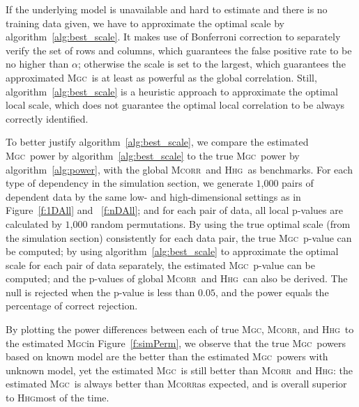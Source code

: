 \documentclass[11pt]{article}
\providecommand{\sct}[1]{{\normalfont\textsc{#1}}}
\newcommand{\Mgc}{\sct{Mgc}}
\newcommand{\Hhg}{\sct{Hhg}}
\newcommand{\Mcorr}{\sct{Mcorr}}
\begin{document}
If the underlying model is unavailable and hard to estimate and there is no training data given, we have to approximate the optimal scale by algorithm~\ref{alg:best_scale}. It makes use of Bonferroni correction to separately verify the set of rows and columns, which guarantees the false positive rate to be no higher than $\alpha$; otherwise the scale is set to the largest, which guarantees the approximated \Mgc~is at least as powerful as the global correlation. Still, algorithm~\ref{alg:best_scale} is a heuristic approach to approximate the optimal local scale, which does not guarantee the optimal local correlation to be always correctly identified.


To better justify algorithm~\ref{alg:best_scale}, we compare the estimated \Mgc~power by algorithm~\ref{alg:best_scale} to the true \Mgc~power by algorithm~\ref{alg:power}, with the global \Mcorr~and \Hhg~as benchmarks. For each type of dependency in the simulation section, we generate $1$,$000$ pairs of dependent data by the same low- and high-dimensional settings as in Figure~\ref{f:1DAll} and ~\ref{f:nDAll}; and for each pair of data, all local p-values are calculated by $1$,$000$ random permutations. By using the true optimal scale (from the simulation section) consistently for each data pair, the true \Mgc~p-value can be computed; by using algorithm~\ref{alg:best_scale} to approximate the optimal scale for each pair of data separately, the estimated \Mgc~p-value can be computed; and the p-values of global \Mcorr~and \Hhg~can also be derived. The null is rejected when the p-value is less than $0.05$, and the power equals the percentage of correct rejection. 

By plotting the power differences between each of true \Mgc, \Mcorr, and \Hhg~to the estimated \Mgc in Figure~\ref{f:simPerm}, we observe that the true \Mgc~powers based on known model are the better than the estimated \Mgc~powers with unknown model, yet the estimated \Mgc~is still better than \Mcorr~and \Hhg: the estimated \Mgc~is always better than \Mcorr as expected, and is overall superior to \Hhg most of the time.
\end{document}
